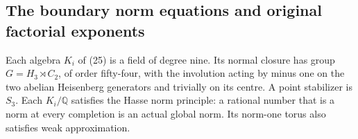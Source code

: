 \subsection{The boundary norm equations and original factorial exponents}
\label{sec:ghost-boundary-norms}

\begin{proposition}
\label{prop:ghost-boundary-hasse-norm}
Each algebra \(K_i\) of (25) is a field of degree nine.
Its normal closure has group
\(G=H_3\rtimes C_2\), of order fifty-four, with
the involution acting by minus one on the two
abelian Heisenberg generators and trivially on its
centre. A point stabilizer is \(S_3\).
Each \(K_i/\mathbb Q\) satisfies the Hasse norm
principle: a rational number that is a norm at
every completion is an actual global norm.
Its norm-one torus also satisfies weak approximation.
\end{proposition}
